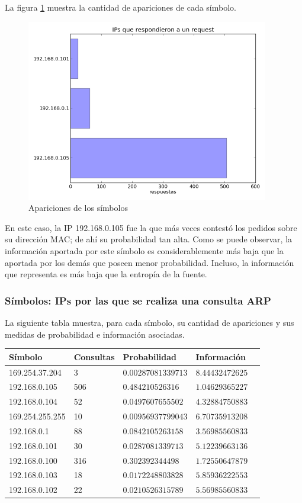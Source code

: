 \documentclass{article}
\begin{document}
La figura \ref{fig:red1repliers:count} muestra la cantidad de apariciones de
cada símbolo.

\begin{figure}[h!]
    \centering
    \includegraphics[width=300pt]{red1repliers.png}
    \caption{Apariciones de los símbolos}
    \label{fig:red1repliers:count}
\end{figure}

En este caso, la IP 192.168.0.105 fue la que más veces contestó los pedidos
sobre su dirección MAC; de ahí su probabilidad tan alta. Como se puede
observar, la información aportada por este símbolo es considerablemente más
baja que la aportada por los demás que poseen menor probabilidad. Incluso, la
información que representa es más baja que la entropía de la fuente.

\subsubsection{Símbolos: IPs por las que se realiza una consulta ARP}
La siguiente tabla muestra, para cada símbolo, su cantidad de apariciones y
sus medidas de probabilidad e información asociadas.

\vskip10pt

\begin{tabular}{|l|l|l|l|l|}
  \hline
  Símbolo & Consultas & Probabilidad & Información \\
  \hline
  169.254.37.204 & 3 & $0.00287081339713$ & $8.44432472625$\\
  \hline
  192.168.0.105 & 506 & $0.484210526316$ & $1.04629365227$\\
  \hline
  192.168.0.104 & 52 & $0.0497607655502$ & $4.32884750883$\\
  \hline
  169.254.255.255 & 10 & $0.00956937799043$ & $6.70735913208$\\
  \hline
  192.168.0.1 & 88 & $0.0842105263158$ & $3.56985560833$\\
  \hline
  192.168.0.101 & 30 & $0.0287081339713$ & $5.12239663136$\\
  \hline
  192.168.0.100 & 316 & $0.302392344498$ & $1.72550647879$\\
  \hline
  192.168.0.103 & 18 & $0.0172248803828$ & $5.85936222553$\\
  \hline
  192.168.0.102 & 22 & $0.0210526315789$ & $5.56985560833$\\
  \hline
\end{tabular}
\end{document}
